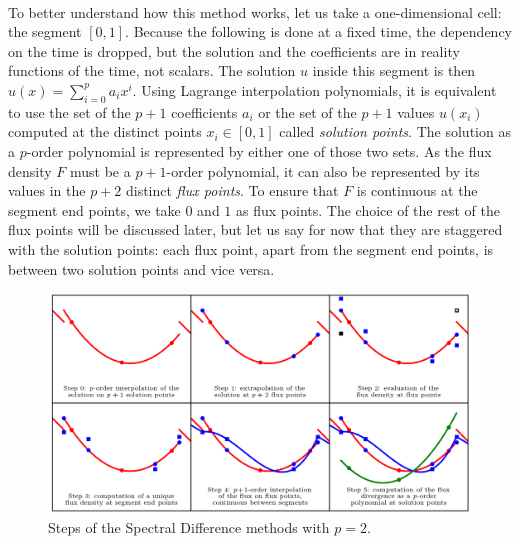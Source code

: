       \paragraph{}
      To better understand how this method works, let us take a one-dimensional cell: the segment $\left[0, 1\right]$.
      Because the following is done at a fixed time, the dependency on the time is dropped, but the solution and the coefficients are in reality functions of the time, not scalars.
      The solution $u$ inside this segment is then $u\left(x\right) = \sum_{i=0}^p a_ix^i$.
      Using Lagrange interpolation polynomials, it is equivalent to use the set of the $p + 1$ coefficients $a_i$ or the set of the $p + 1$ values $u\left(x_i\right)$ computed at the distinct points $x_i \in \left[0, 1\right]$ called \emph{solution points}.
      The solution as a $p$-order polynomial is represented by either one of those two sets.
      As the flux density $F$ must be a $p\!+\!1$-order polynomial, it can also be represented by its values in the $p + 2$ distinct \emph{flux points}.
      To ensure that $F$ is continuous at the segment end points, we take $0$ and $1$ as flux points.
      The choice of the rest of the flux points will be discussed later, but let us say for now that they are staggered with the solution points: each flux point, apart from the segment end points, is between two solution points and vice versa.

      \begin{figure}
        \centering
        \includegraphics{figures/sd_scheme.png}
        \caption{Steps of the Spectral Difference methods with $p = 2$.}
        \label{fig:sd_scheme}
      \end{figure}

